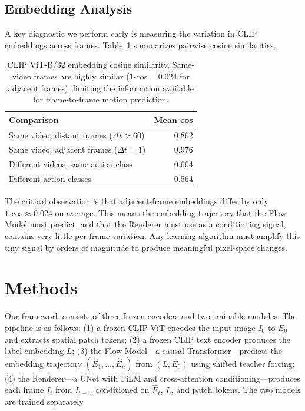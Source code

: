 \documentclass[10pt,twocolumn,letterpaper]{article}
\begin{document}
\subsection{Embedding Analysis}
A key diagnostic we perform early is measuring the variation in CLIP
embeddings across frames. Table~\ref{tab:embed_analysis} summarizes pairwise
cosine similarities.

\begin{table}[h]
\centering
\caption{CLIP ViT-B/32 embedding cosine similarity. Same-video frames are
highly similar ($\text{1-cos}=0.024$ for adjacent frames), limiting the
information available for frame-to-frame motion prediction.}
\label{tab:embed_analysis}
\begin{tabular}{lr}
\toprule
\textbf{Comparison} & \textbf{Mean cos} \\
\midrule
Same video, distant frames ($\Delta t \approx 60$) & 0.862 \\
Same video, adjacent frames ($\Delta t = 1$)       & 0.976 \\
Different videos, same action class                & 0.664 \\
Different action classes                           & 0.564 \\
\bottomrule
\end{tabular}
\end{table}

The critical observation is that adjacent-frame embeddings differ by only
$\text{1-cos} \approx 0.024$ on average. This means the embedding trajectory
that the Flow Model must predict, and that the Renderer must use as a
conditioning signal, contains very little per-frame variation. Any
learning algorithm must amplify this tiny signal by orders of magnitude
to produce meaningful pixel-space changes.

\section{Methods}

Our framework consists of three frozen encoders and two trainable modules.
The pipeline is as follows: (1) a frozen CLIP ViT encodes the input image
$I_0$ to $E_0$ and extracts spatial patch tokens; (2) a frozen CLIP text
encoder produces the label embedding $L$; (3) the Flow Model---a causal
Transformer---predicts the embedding trajectory $(\hat{E}_1, \dots,
\hat{E}_n)$ from $(L, E_0)$ using shifted teacher forcing; (4) the
Renderer---a UNet with FiLM and cross-attention conditioning---produces
each frame $I_t$ from $I_{t-1}$, conditioned on $\hat{E}_t$, $L$, and
patch tokens. The two models are trained separately.
\end{document}
